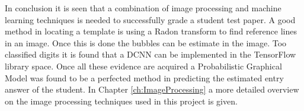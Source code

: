 In conclusion it is seen that a combination of image processing and machine learning techniques is needed to successfully grade a student test paper. A good method in locating a template is using a Radon transform to find reference lines in an image. Once this is done the bubbles can be estimate in the image. Too classified digits it is found that a DCNN can be implemented in the TensorFlow library space. Once all these evidence are acquired a Probabilistic Graphical Model was found to be a perfected method in predicting the estimated entry answer of the student.
In Chapter \ref{ch:ImageProcessing} a more detailed overview on the image processing techniques used in this project is given.
